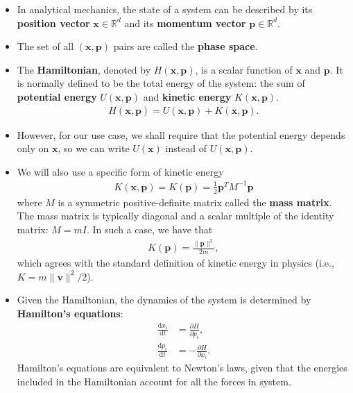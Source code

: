 \documentclass[10pt]{article}
\newcommand{\dee}{\mathrm{d}}
\newcommand{\ve}[1]{\mathbf{#1}}
\newcommand{\Real}{\mathbb{R}}
\begin{document}
\begin{itemize}  
  \item In analytical mechanics, the state of a system can be described by its {\bf position vector} $\ve{x} \in \Real^d$ and its {\bf momentum vector} $\ve{p} \in \Real^d$. 
  
  \item The set of all $(\ve{x},\ve{p})$ pairs are called the {\bf phase space}. 
  
  \item The {\bf Hamiltonian}, denoted by $H(\ve{x},\ve{p})$, is a scalar function of $\ve{x}$ and $\ve{p}$. It is normally defined to be the total energy of the system: the sum of {\bf potential energy} $U(\ve{x},\ve{p})$ and {\bf kinetic energy} $K(\ve{x},\ve{p})$.
  \begin{align*}
    H(\ve{x},\ve{p}) = U(\ve{x},\ve{p}) + K(\ve{x},\ve{p}).
  \end{align*}

  \item However, for our use case, we shall require that the potential energy depends only on $\ve{x}$, so we can write $U(\ve{x})$ instead of $U(\ve{x},\ve{p})$. 
  
  \item We will also use a specific form of kinetic energy
  \begin{align*}
    K(\ve{x},\ve{p}) = K(\ve{p}) = \frac{1}{2} \ve{p}^T M^{-1} \ve{p}
  \end{align*}
  where $M$ is a symmetric positive-definite matrix called the {\bf mass matrix}. The mass matrix is typically diagonal and a scalar multiple of the identity matrix: $M = mI$. In such a case, we have that
  \begin{align*}
    K(\ve{p}) = \frac{\| \ve{p}\|^2}{2m},
  \end{align*}
  which agrees with the standard definition of kinetic energy in physics (i.e., $K = m\|\ve{v}\|^2/2$).
  
  \item Given the Hamiltonian, the dynamics of the system is determined by {\bf Hamilton's equations}:
  \begin{align*}
    \frac{\dee x_i}{\dee t} &= \frac{\partial H}{\partial p_i}, \\
    \frac{\dee p_i}{\dee t} &= -\frac{\partial H}{\partial x_i}.
  \end{align*}
  Hamilton's equations are equivalent to Newton's laws, given that the energies included in the Hamiltonian account for all the forces in system.


\end{itemize}
\end{document}
